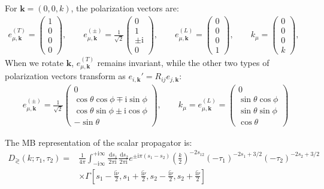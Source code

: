 \documentclass[a4paper,12pt]{article}
\def\mb{\mathbf}
\begin{document}
For $\mb{k}=(0,0,k)$, the polarization vectors are:
\begin{align}
    e_{\mu,\mathbf{k}}^{(T)} = \begin{pmatrix} 1 \\ 0 \\ 0 \\ 0 \end{pmatrix} , \qquad
    e_{\mu,\mathbf{k}}^{(\pm)} = \frac{1}{\sqrt{2}} \begin{pmatrix} 0 \\ 1 \\ \pm \mathrm{i} \\ 0 \end{pmatrix} , \qquad
    e_{\mu,\mathbf{k}}^{(L)} = \begin{pmatrix} 0 \\ 0 \\ 0 \\ 1 \end{pmatrix}, \qquad
    k_\mu = \begin{pmatrix} 0 \\ 0 \\ 0 \\ k \end{pmatrix}, \qquad
\end{align}
When we rotate $\mb{k}$, $e_{\mu,\mathbf{k}}^{(T)}$ remains invariant, while the other two types of polarization vectors transform as $e_{i,\mathbf{k}}' = R_{ij}e_{j,\mathbf{k}}$:
\begin{align}
    e_{\mu,\mathbf{k}}^{(\pm)} = \frac{1}{\sqrt{2}} \begin{pmatrix} 0 \\ \cos\theta\cos\phi \mp \mathrm{i}\sin\phi \\ \cos\theta\sin\phi \pm \mathrm{i}\cos\phi \\ -\sin\theta \end{pmatrix}, \qquad
    k_\mu = e_{\mu,\mathbf{k}}^{(L)} = \begin{pmatrix} 0 \\ \sin\theta\cos\phi \\ \sin\theta\sin\phi \\ \cos\theta \end{pmatrix}
\end{align}


The MB representation of the scalar propagator is:
\begin{align}
    D_\gtrless \left(k ; \tau_{1}, \tau_{2}\right)= & \frac{1}{4 \pi} \int_{-\mathrm{i} \infty}^{+\mathrm{i} \infty} \frac{\mathrm{~d} s_{1}}{2 \pi \mathrm{i}} \frac{\mathrm{~d} s_{2}}{2 \pi \mathrm{i}} e^{\pm \mathrm{i} \pi\left(s_{1}-s_{2}\right)}\left(\frac{k}{2}\right)^{-2 s_{12}}\left(-\tau_{1}\right)^{-2 s_{1}+3 / 2}\left(-\tau_{2}\right)^{-2 s_{2}+3 / 2} \\
    & \times \Gamma\left[s_{1}-\frac{\mathrm{i} \widetilde{\nu}}{2}, s_{1}+\frac{\mathrm{i} \widetilde{\nu}}{2}, s_{2}-\frac{\mathrm{i} \widetilde{\nu}}{2}, s_{2}+\frac{\mathrm{i} \widetilde{\nu}}{2}\right]
\end{align}
\end{document}
